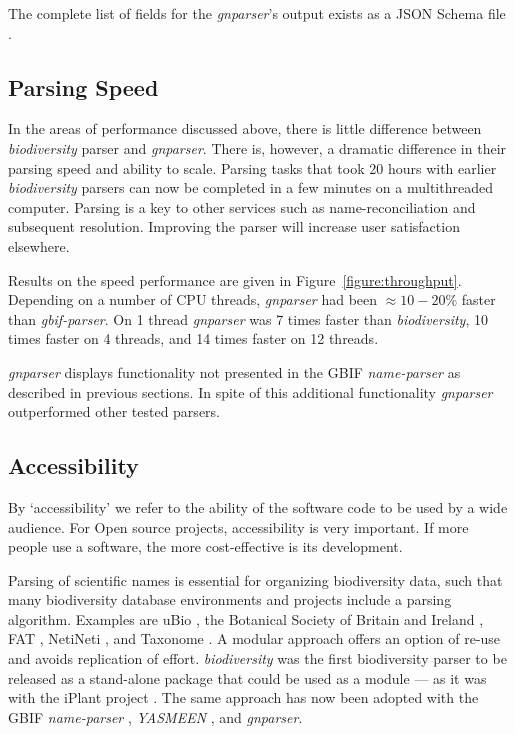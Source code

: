 \documentclass{bmcart}
\begin{document}
The complete list of fields for the \textit{gnparser}'s output exists as a JSON Schema file \cite{gnparser-json}.

\subsection*{Parsing Speed}

In the areas of performance discussed above, there is little difference between \textit{biodiversity} parser and \textit{gnparser}. There is, however, a dramatic difference in their parsing speed and ability to scale. Parsing tasks that took 20 hours with earlier \textit{biodiversity} parsers can now be completed in a few minutes on a multithreaded computer. Parsing is a key to other services such as name-reconciliation and subsequent resolution.  Improving the parser will increase user satisfaction elsewhere.

Results on the speed performance are given in Figure~\ref{figure:throughput}.  Depending on a number of CPU threads, \textit{gnparser} had been $\approx10-20\%$ faster than \textit{gbif-parser}. On 1 thread \textit{gnparser} was 7 times faster than \textit{biodiversity}, 10 times faster on 4 threads, and 14 times faster on 12 threads.

\textit{gnparser} displays functionality not presented in the GBIF \textit{name-parser} as described in previous sections. In spite of this additional functionality \textit{gnparser} outperformed other tested parsers.

\subsection*{Accessibility}

By `accessibility' we refer to the ability of the software code to be used by a wide audience. For Open source projects, accessibility is very important. If more people use a software, the more cost-effective is its development.

Parsing of scientific names is essential for organizing biodiversity data, such that many biodiversity database environments and projects include a parsing algorithm. Examples are uBio \cite{ubio:parser}, the Botanical Society of Britain and Ireland \cite{botsociety:parser}, FAT \cite{Sautter2006}, NetiNeti \cite{Akella2012}, and Taxonome \cite{Kluyver2013}. A modular approach offers an option of re-use and avoids replication of effort. \textit{biodiversity} was the first biodiversity parser to be released as a stand-alone package that could be used as a module --- as it was with the iPlant project \cite{Boyle2013}.  The same approach has now been adopted with the GBIF \textit{name-parser} \cite{gbifNameParser}, \textit{YASMEEN} \cite{VandenBerghe2015}, and \textit{gnparser}.
\end{document}

